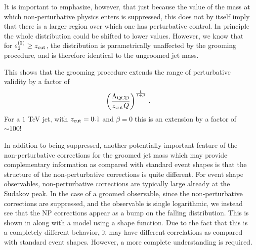 It is important to emphasize, however, that just because the value of the mass at which non-perturbative physics enters is suppressed, this does not by itself imply that there is a larger region over which one has perturbative control. In principle the whole distribution could be shifted to lower values. However, we know that for $e_{2}^{(2)} \geq z_{\rm cut}$, the distribution is parametrically unaffected by the grooming procedure, and is therefore identical to the ungroomed jet mass. 

This shows that the grooming procedure extends the range of perturbative validity by a factor of 
\begin{align}
\left( \frac{{\Lambda_\text{QCD}}}{z_{\rm cut} Q}  \right)^{\frac{1}{1+\beta}} \,.
\end{align}
For a $1$ TeV jet, with $z_{\rm cut} =0.1$ and $\beta=0$ this is an extension by a factor of $\sim 100$!


In addition to being suppressed, another potentially important feature of the non-perturbative corrections for the groomed jet mass which may provide complementary information as compared with standard event shapes is that the structure of the non-perturbative corrections is quite different. For event shape observables, non-perturbative corrections are typically large already at the Sudakov peak. In the case of a groomed observable, since the non-perturbative corrections are suppressed, and the observable is single logarithmic, we instead see that the NP corrections appear as a bump on the falling distribution. This is shown in  along with a model using a shape function. Due to the fact that this is a completely different behavior, it may have different correlations as compared with standard event shapes. However, a more complete understanding is required. 


